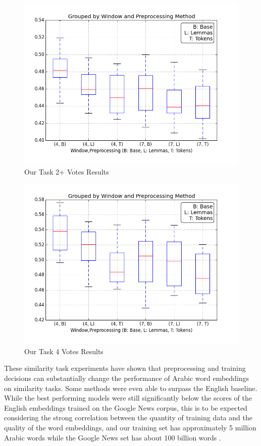 \begin{figure}
  \includegraphics[width=\linewidth]{results_spearman/ar_similiarity_task_multi_results_spearplot.png}
  \caption{Our Task 2+ Votes Results}
  \label{fig:spearplot2}
\end{figure}

\begin{figure}
  \includegraphics[width=\linewidth]{results_spearman/ar_similiarity_task_4_votes_results_spearplot.png}
  \caption{Our Task 4 Votes Results}
  \label{fig:spearplot4}
\end{figure}



These similarity task experiments have shown that preprocessing and training decisions can substantially change the performance of Arabic word embeddings on similarity tasks. Some methods were even able to surpass the English baseline. While the best performing models were still significantly below the scores of the English embeddings trained on the Google News corpus, this is to be expected considering the strong correlation between the quantity of training data and the quality of the word embeddings, and our training set has approximately 5 million Arabic words while the Google News set has about 100 billion words \cite{mikolovdist:2013}.

